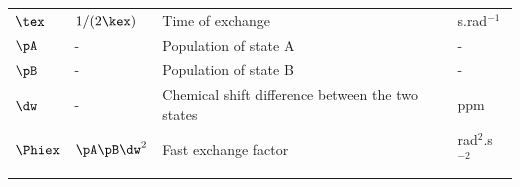 \begin{table}
\begin{center}
\begin{tabular}{llll}
$\tex$                  & $1 / (2 \kex)$        & Time of exchange                                                              & s.rad$^{-1}$ \\
$\pA$                   & -                     & Population of state A                                                         & - \\
$\pB$                   & -                     & Population of state B                                                         & - \\
$\dw$                   & -                     & Chemical shift difference between the two states                              & ppm \\
$\Phiex$                & $\pA\pB\dw^2$         & Fast exchange factor                                                          & rad$^2$.s$^{-2}$ \\
\bottomrule
\label{table: dispersion parameters}
\end{tabular}
\end{center}
\end{table}


